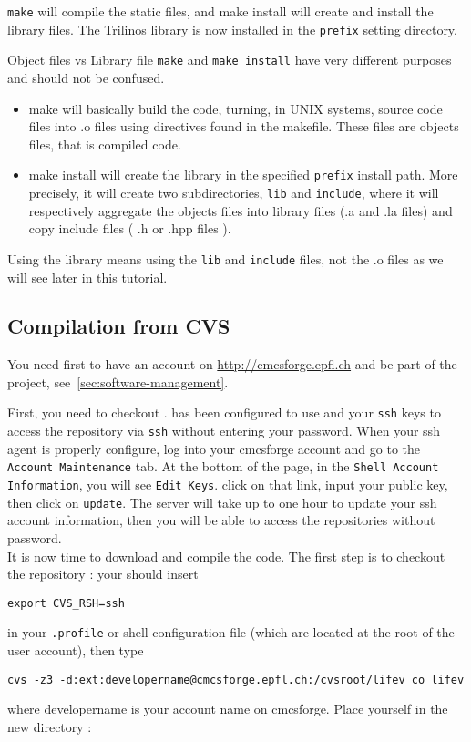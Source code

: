 \verb|make| will compile the static files, and make install will create and install
the library files. The Trilinos library is now installed in the \verb!prefix! setting directory.

\begin{hint}{Object files vs Library file}
\verb|make| and \verb|make install| have very different purposes and should not be confused.
\begin{itemize}
\item make will basically build the code, turning, in UNIX systems, source code
files into .o files using directives found in the makefile. These files are objects files, that is compiled code.
\item make install will create the library in the specified \verb|prefix| install path.
More precisely, it will create two subdirectories, \verb|lib| and \verb|include|, where
it will respectively aggregate the objects files into library files (.a and .la files)
and copy include files ( .h or .hpp files ).
\end{itemize}
Using the library means using the \verb|lib| and \verb|include| files, not the .o files as we will see later
in this tutorial.
\end{hint}


\subsection{Compilation from CVS}
\label{sec:compile-cvs}
You need first to have an account on \url{http://cmcsforge.epfl.ch} and
be part of the \lifev project, see~\ref{sec:software-management}.

\noindent First, you need to checkout \lifev.  has
been configured to use  and your \verb!ssh! keys to
access the repository via \verb!ssh! without entering your password.
When your ssh agent is properly configure, log into your cmcsforge account and
go to the \verb!Account Maintenance! tab. At the bottom of the page, in the
\verb!Shell Account Information!, you will see \verb!Edit Keys!. click on that link,
input your public key, then click on \verb!update!. The server will take up to one
hour to update your ssh account information, then you will be able to access the
repositories without password.\\

It is now time to download and compile the code. The first step is to checkout the repository : your should insert

\begin{verbatim}
export CVS_RSH=ssh
\end{verbatim}
in your \verb!.profile! or shell configuration file (which are located at the root of the user account), then type
\begin{verbatim}
cvs -z3 -d:ext:developername@cmcsforge.epfl.ch:/cvsroot/lifev co lifev
\end{verbatim}
where developername is your account name on cmcsforge. Place yourself in the new directory :

